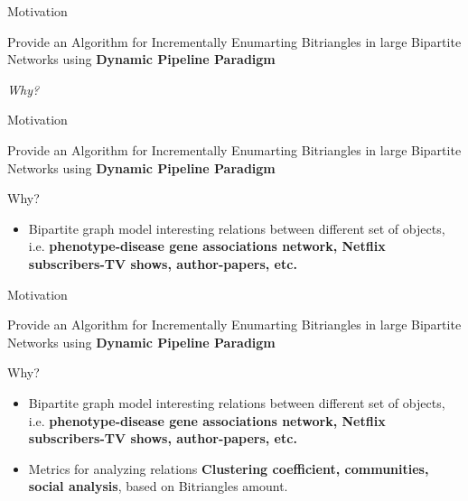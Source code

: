 \documentclass{beamer}
\begin{document}
  \begin{frame}[fragile]{Motivation}
    \begin{center}
      Provide an Algorithm for Incrementally Enumarting Bitriangles in large Bipartite Networks using \textbf{Dynamic Pipeline Paradigm}
    \end{center}    
    \vspace{0.5cm}
    \begin{center}
    \huge\emph{Why?}
    \end{center}
  \end{frame}

  \begin{frame}[fragile]{Motivation}
    \begin{center}
      Provide an Algorithm for Incrementally Enumarting Bitriangles in large Bipartite Networks using \textbf{Dynamic Pipeline Paradigm}
    \end{center}    
    \begin{block}{Why?}
      \begin{itemize}
        \item Bipartite graph model interesting relations between different set of objects, i.e. \textbf{phenotype-disease gene associations network, Netflix subscribers-TV shows, author-papers, etc.}
      \end{itemize}
    \end{block}
  \end{frame}

  \begin{frame}[fragile]{Motivation}
    \begin{center}
      Provide an Algorithm for Incrementally Enumarting Bitriangles in large Bipartite Networks using \textbf{Dynamic Pipeline Paradigm}
    \end{center}    
    \begin{block}{Why?}
      \begin{itemize}
        \item {\color{light}Bipartite graph model interesting relations between different set of objects, i.e. \textbf{phenotype-disease gene associations network, Netflix subscribers-TV shows, author-papers, etc.}}
        \item Metrics for analyzing relations \textbf{Clustering coefficient, communities, social analysis}, based on Bitriangles amount.
      \end{itemize}
    \end{block}
  \end{frame}
\end{document}
